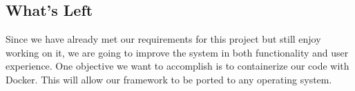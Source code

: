 \documentclass[draftclsnofoot, onecolumn, compsoc, 10pt]{IEEEtran}
\begin{document}
\subsection{What's Left}
Since we have already met our requirements for this project but still enjoy working on it, we are going to improve the system in both functionality and user experience. One objective we want to accomplish is to containerize our code with Docker. This will allow our framework to be ported to any operating system.
\end{document}
